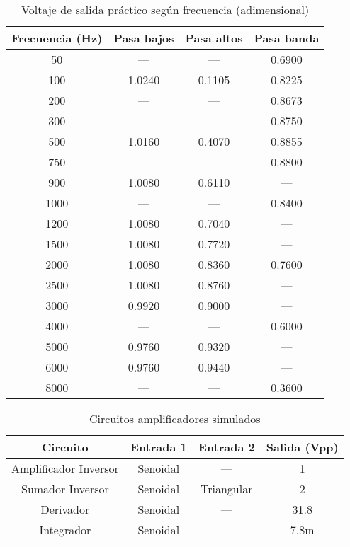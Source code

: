 \begin{table}[H]
  \centering
  \caption{Voltaje de salida práctico según frecuencia (adimensional)}
  \label{tab:filtros_practicos}
  \begin{tabular}{cccc}
    \toprule
    \textbf{Frecuencia (Hz)} & \textbf{Pasa bajos} & \textbf{Pasa altos} & \textbf{Pasa banda} \\
    \midrule
    50    & ---    & ---    & 0.6900 \\
    100   & 1.0240 & 0.1105 & 0.8225 \\
    200   & ---    & ---    & 0.8673 \\
    300   & ---    & ---    & 0.8750 \\
    500   & 1.0160 & 0.4070 & 0.8855 \\
    750   & ---    & ---    & 0.8800 \\
    900   & 1.0080 & 0.6110 & ---     \\
    1000  & ---    & ---    & 0.8400 \\
    1200  & 1.0080 & 0.7040 & ---     \\
    1500  & 1.0080 & 0.7720 & ---     \\
    2000  & 1.0080 & 0.8360 & 0.7600 \\
    2500  & 1.0080 & 0.8760 & ---     \\
    3000  & 0.9920 & 0.9000 & ---     \\
    4000  & ---    & ---    & 0.6000 \\
    5000  & 0.9760 & 0.9320 & ---     \\
    6000  & 0.9760 & 0.9440 & ---     \\
    8000  & ---    & ---    & 0.3600 \\
    \bottomrule
  \end{tabular}
\end{table}

\begin{table}[H]
  \centering
  \caption{Circuitos amplificadores simulados}
  \label{tab:amplificadores_simulacion}
  \begin{tabular}{cccc}
    \toprule
    \textbf{Circuito} & \textbf{Entrada 1} & \textbf{Entrada 2} & \textbf{Salida (Vpp)} \\
    \midrule
    Amplificador Inversor  & Senoidal & ---         & 1    \\
    Sumador Inversor       & Senoidal & Triangular & 2    \\
    Derivador              & Senoidal & ---         & 31.8 \\
    Integrador             & Senoidal & ---         & 7.8m \\
    \bottomrule
  \end{tabular}
\end{table}


